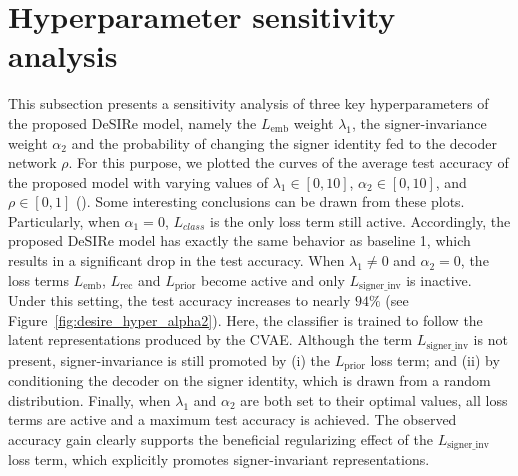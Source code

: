 \section{Hyperparameter sensitivity analysis}
\label{sec:desire_hyperparams}
This subsection presents a sensitivity analysis of three key hyperparameters of the proposed DeSIRe model, namely the $L_{\text{emb}}$ weight $\lambda_{1}$, the signer-invariance weight $\alpha_{2}$ and the probability of changing the signer identity fed to the decoder network $\rho$. For this purpose, we plotted the curves of the average test accuracy of the proposed model with varying values of $\lambda_{1}\in[0,10]$,  $\alpha_{2}\in[0,10]$, and $\rho\in[0,1]$ (). Some interesting conclusions can be drawn from these plots. Particularly, when $\alpha_{1}=0$, $L_{class}$ is the only loss term still active. Accordingly, the proposed DeSIRe model has exactly the same behavior as baseline 1, which results in a significant drop in the test accuracy. When $\lambda_{1}\neq 0$ and $\alpha_{2}=0$, the loss terms $L_{\text{emb}}$, $L_{\text{rec}}$ and $L_{\text{prior}}$ become active and only $L_{\text{signer\_inv}}$ is inactive. Under this setting, the test accuracy increases to nearly $94\%$ (see Figure~\ref{fig:desire_hyper_alpha2}). Here, the classifier is trained to follow the latent representations produced by the CVAE. Although the term $L_{\text{signer\_inv}}$ is not present, signer-invariance is still promoted by (i) the $L_{\text{prior}}$ loss term; and (ii) by conditioning the decoder on the signer identity, which is drawn from a random distribution. Finally, when $\lambda_1$ and $\alpha_2$ are both set to their optimal values, all loss terms are active and a maximum test accuracy is achieved. The observed accuracy gain clearly supports the beneficial regularizing effect of the $L_{\text{signer\_inv}}$ loss term, which explicitly promotes signer-invariant representations.

